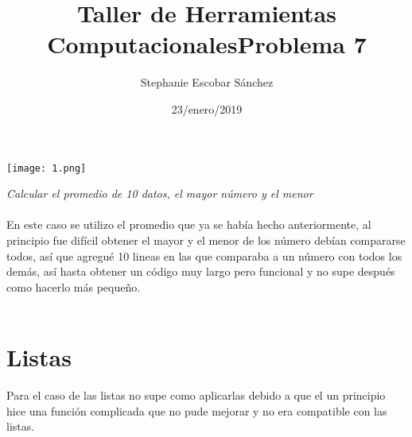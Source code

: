 \documentclass{article}
\title{\Huge Taller de Herramientas Computacionales}
\author{Stephanie Escobar Sánchez}
\date{23/enero/2019}
\begin{document}
	\maketitle
	\begin{center}
		\texttt{[image: 1.png]}	
	\end{center}
	\newpage
	\begin{center}
		\title {\Huge Problema 7} 
	\end{center}

\textit{Calcular el promedio de 10 datos, el mayor número y el menor}\\
\\
En este caso se utilizo el promedio que ya se había hecho anteriormente, al principio fue difícil obtener el mayor y el menor de los número debían compararse todos, así que agregué 10 lineas en las que comparaba a un número con todos los demás, así hasta obtener un código muy largo pero funcional y no supe después como hacerlo más pequeño.\\
\\
\section*{Listas}
Para el caso de las listas no supe como aplicarlas debido a que el un principio hice una función complicada que no pude mejorar y no era compatible con las listas.
\end{document}
